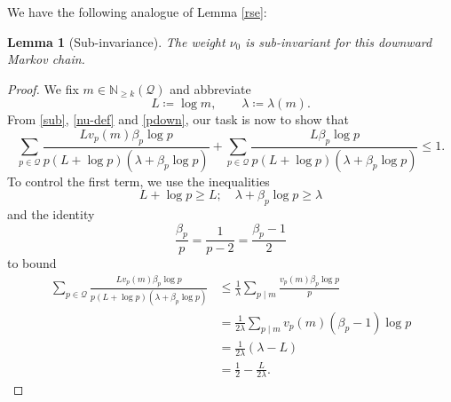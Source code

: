 \documentclass[12pt]{amsart}
\newtheorem{lemma}[theorem]{Lemma}
\theoremstyle{definition}
\theoremstyle{remark}
\numberwithin{equation}{section}
\newcommand{\N}{{\mathbb N}}
\newcommand{\1}{{\mathbf 1}}
\begin{document}
We have the following analogue of Lemma \ref{rse}:

\begin{lemma}[Sub-invariance]  The weight $\nu_0$ is sub-invariant for this downward Markov chain.
\end{lemma}

\begin{proof}
We fix $m \in \N_{\geq k}({\mathcal Q})$ and abbreviate 
$$L\coloneq \log m,\qquad \lambda\coloneq \lambda(m).$$ 
From \eqref{sub}, \eqref{nu-def} and \eqref{pdown}, our task is now to show that
\begin{equation}\label{task}
 \sum_{p\in\mathcal Q}
\frac{L v_p(m) \beta_p\log p}{p(L+\log p)(\lambda+\beta_p\log p)} + \sum_{p \in {\mathcal Q}} \frac{L \beta_p\log p}{p(L+\log p)(\lambda+\beta_p\log p)} \leq 1.
 \end{equation}
To control the first term, we use the inequalities
$$L+\log p\ge L; \quad \lambda+\beta_p\log p\ge\lambda$$
and the identity
$$\frac{\beta_p}{p}=\frac1{p-2}=\frac{\beta_p-1}{2}$$
to bound
\begin{align*}
 \sum_{p\in\mathcal Q}
\frac{L v_p(m) \beta_p\log p}{p(L+\log p)(\lambda+\beta_p\log p)} &\le\frac1{\lambda}\sum_{p\mid m}\frac{v_p(m)\beta_p\log p}{p}\\
&=\frac1{2\lambda}\sum_{p\mid m}v_p(m)(\beta_p-1)\log p\\
&=\frac{1}{2\lambda} (\lambda-L) \\
&= \frac{1}{2} - \frac{L}{2\lambda}.
\end{align*}


\end{proof}
\end{document}
